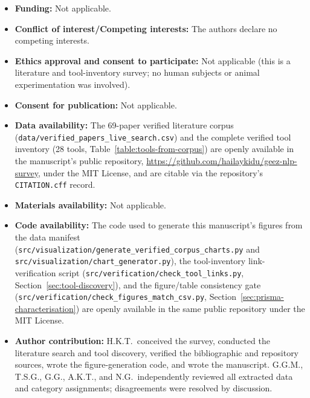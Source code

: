 \documentclass[sn-mathphys-num]{sn-jnl}
\theoremstyle{thmstyleone}
\theoremstyle{thmstyletwo}
\theoremstyle{thmstylethree}
\begin{document}
\begin{itemize}
\item \textbf{Funding:} Not applicable.
\item \textbf{Conflict of interest/Competing interests:} The authors declare no competing interests.
\item \textbf{Ethics approval and consent to participate:} Not applicable (this is a literature and tool-inventory survey; no human subjects or animal experimentation was involved).
\item \textbf{Consent for publication:} Not applicable.
\item \textbf{Data availability:} The 69-paper verified literature corpus (\texttt{data/verified\_papers\_live\_search.csv}) and the complete verified tool inventory (28 tools, Table~\ref{table:tools-from-corpus}) are openly available in the manuscript's public repository, \url{https://github.com/hailaykidu/geez-nlp-survey}, under the MIT License, and are citable via the repository's \texttt{CITATION.cff} record.
\item \textbf{Materials availability:} Not applicable.
\item \textbf{Code availability:} The code used to generate this manuscript's figures from the data manifest (\texttt{src/visualization/generate\_verified\_corpus\_charts.py} and \texttt{src/visualization/chart\_generator.py}), the tool-inventory link-verification script (\texttt{src/verification/check\_tool\_links.py}, Section~\ref{sec:tool-discovery}), and the figure/table consistency gate (\texttt{src/verification/check\_figures\_match\_csv.py}, Section~\ref{sec:prisma-characterisation}) are openly available in the same public repository under the MIT License.
\item \textbf{Author contribution:} H.K.T.\ conceived the survey, conducted the literature search and tool discovery, verified the bibliographic and repository sources, wrote the figure-generation code, and wrote the manuscript. G.G.M., T.S.G., G.G., A.K.T., and N.G.\ independently reviewed all extracted data and category assignments; disagreements were resolved by discussion.
\end{itemize}


\end{document}
